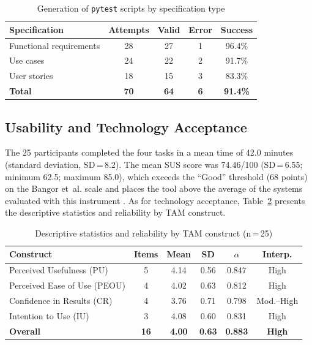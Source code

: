 \documentclass[10pt,journal,twoside,letterpaper]{IEEEtran}
\begin{document}
    \begin{table}[!tb]
        \caption{Generation of \texttt{pytest} scripts by specification type}
        \label{tab:generacion}
        \centering
        \small
        \begin{tabular}{@{}lcccc@{}}
            \toprule
            \textbf{Specification} & \textbf{Attempts} & \textbf{Valid} & \textbf{Error} & \textbf{Success} \\
            \midrule
            Functional requirements & 28 & 27 & 1 & 96.4\% \\
            Use cases               & 24 & 22 & 2 & 91.7\% \\
            User stories            & 18 & 15 & 3 & 83.3\% \\
            \midrule
            \textbf{Total}          & \textbf{70} & \textbf{64} & \textbf{6} & \textbf{91.4\%} \\
            \bottomrule
        \end{tabular}
    \end{table}
    
    \subsection{Usability and Technology Acceptance}
    \label{subsec:sustam}
    
    The 25 participants completed the four tasks in a mean time of 42.0 minutes (standard deviation, SD\,=\,8.2). The mean SUS score was 74.46/100 (SD\,=\,6.55; minimum 62.5; maximum 85.0), which exceeds the ``Good'' threshold (68 points) on the Bangor et~al. scale and places the tool above the average of the systems evaluated with this instrument \cite{bangor2009sus}. As for technology acceptance, Table~\ref{tab:tam} presents the descriptive statistics and reliability by TAM construct.
    
    \begin{table}[!tb]
        \caption{Descriptive statistics and reliability by TAM construct (n\,=\,25)}
        \label{tab:tam}
        \centering
        \small
        \setlength{\tabcolsep}{3pt}
        \begin{tabular}{@{}lccccc@{}}
            \toprule
            \textbf{Construct} & \textbf{Items} & \textbf{Mean} & \textbf{SD} & \textbf{$\alpha$} & \textbf{Interp.} \\
            \midrule
            Perceived Usefulness (PU)   & 5 & 4.14 & 0.56 & 0.847 & High \\
            Perceived Ease of Use (PEOU) & 4 & 4.02 & 0.63 & 0.812 & High \\
            Confidence in Results (CR)  & 4 & 3.76 & 0.71 & 0.798 & Mod.--High \\
            Intention to Use (IU)       & 3 & 4.08 & 0.60 & 0.831 & High \\
            \midrule
            \textbf{Overall}            & \textbf{16} & \textbf{4.00} & \textbf{0.63} & \textbf{0.883} & \textbf{High} \\
            \bottomrule
        \end{tabular}
    \end{table}
    
\end{document}
